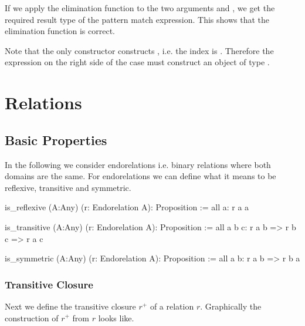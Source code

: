 If we apply the elimination function to the two arguments  and
, we get the required result type  of the pattern
match expression. This shows that the elimination function is correct.

Note that the only constructor  constructs , i.e.
the index is . Therefore the expression on the right side of the case
must construct an object of type .






\newpage


\section{Relations}
\label{sec:certprog-relations}


\subsection{Basic Properties}


In the following we consider endorelations i.e. binary relations where both
domains are the same. For endorelations we can define what it means to be
reflexive, transitive and symmetric.

\begin{alba}
  is_reflexive (A:Any) (r: Endorelation A): Proposition :=
    all a: r a a

  is_transitive (A:Any) (r: Endorelation A): Proposition :=
    all a b c: r a b => r b c => r a c

  is_symmetric (A:Any) (r: Endorelation A): Proposition :=
    all a b: r a b => r b a
\end{alba}



\subsubsection{Transitive Closure}

Next we define the transitive closure $r^+$ of a relation $r$. Graphically the
construction of $r^+$ from $r$ looks like.



